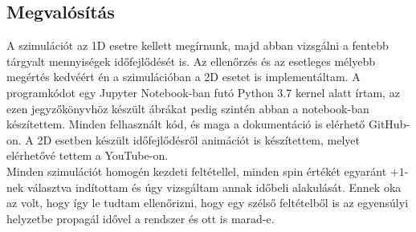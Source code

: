\subsection{Megvalósítás}
A szimulációt az 1D esetre kellett megírnunk, majd abban vizsgálni a fentebb tárgyalt mennyiségek időfejlődését is. Az ellenőrzés és az esetleges mélyebb megértés kedvéért én a szimulációban a 2D esetet is implementáltam. A programkódot egy Jupyter Notebook-ban futó Python 3.7 kernel alatt írtam, az ezen jegyzőkönyvhöz készült ábrákat pedig szintén abban a notebook-ban készítettem. Minden felhasznált kód, és maga a dokumentáció is elérhető GitHub-on\cite{github}. A 2D esetben készült időfejlődésről animációt is készítettem, melyet elérhetővé tettem a YouTube-on\cite{yt}. \\
Minden szimulációt homogén kezdeti feltétellel, minden spin értékét egyaránt $+1$-nek választva indítottam és úgy vizsgáltam annak időbeli alakulását. Ennek oka az volt, hogy így le tudtam ellenőrizni, hogy egy szélső feltételből is az egyensúlyi helyzetbe propagál idővel a rendszer és ott is marad-e.

